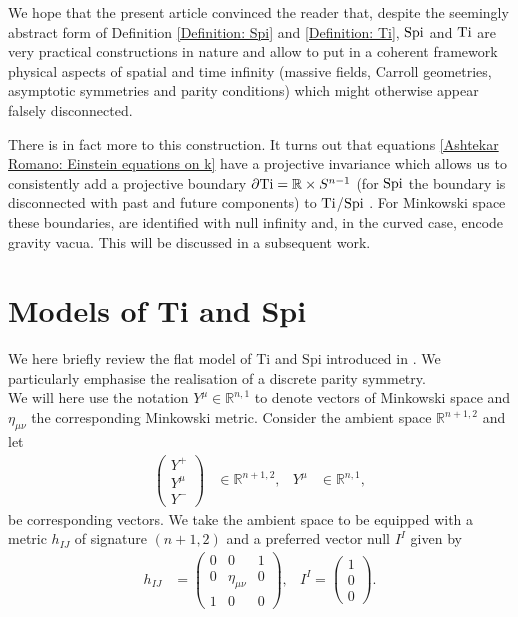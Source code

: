 \documentclass[a4paper, 10pt]{article}
\theoremstyle{remark}
\newcommand{\Ti}{\textnormal{Ti}}
\newcommand{\Spi}{\textnormal{Spi}}
\begin{document}
We hope that the present article convinced the reader that, despite the seemingly abstract form of Definition \ref{Definition: Spi} and \ref{Definition: Ti}, $\Spi$ and $\Ti$ are very practical constructions in nature and allow to put in a coherent framework physical aspects of spatial and time infinity (massive fields, Carroll geometries, asymptotic symmetries and parity conditions) which might otherwise appear falsely disconnected. 

There is in fact more to this construction. It turns out that equations \eqref{Ashtekar Romano: Einstein equations on k} have a projective invariance which allows us to consistently add a projective boundary $\partial\Ti = \mathbb{R} \times S^{n-1}$ (for $\Spi$ the boundary is disconnected with past and future components) to $\Ti$/$\Spi$ . For Minkowski space these boundaries, are identified with null infinity and, in the curved case, encode gravity vacua. This will be discussed in a subsequent work.

\appendix

\section{Models of Ti and Spi} \label{section: appendix Ti/Spi}

We here briefly review the flat model of Ti and Spi introduced in \cite{Figueroa-OFarrill:2021sxz} . We particularly emphasise the realisation of a discrete parity symmetry.\\

We will here use the notation $Y^{\mu} \in \mathbb{R}^{n,1}$ to denote vectors of Minkowski space and $\eta_{\mu\nu}$ the corresponding Minkowski metric. Consider the ambient space $\mathbb{R}^{n+1,2}$ and let 
\begin{align}
    \begin{pmatrix}
        Y^+ \\ Y^{\mu} \\ Y^-
    \end{pmatrix} &\in \mathbb{R}^{n+1,2}, &  Y^{\mu} &\in \mathbb{R}^{n,1},
\end{align}
be corresponding vectors. We take the ambient space to be equipped with a metric $h_{IJ}$ of signature $(n+1,2)$ and a preferred vector null $I^{I}$ given by
\begin{align}
    h_{IJ}  &= \begin{pmatrix}
        0 & 0 & 1 \\ 0 &\eta_{\mu\nu} & 0 \\ 1 & 0 & 0
    \end{pmatrix}, & I^{I} = \begin{pmatrix}
        1 \\ 0 \\ 0
    \end{pmatrix}.
\end{align}
\end{document}
